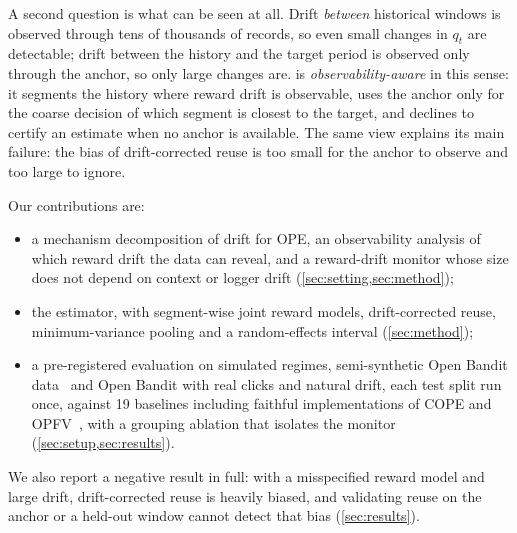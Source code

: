 A second question is what can be seen at all. Drift \emph{between} historical windows is
observed through tens of thousands of records, so even small changes in $q_t$ are detectable;
drift between the history and the target period is observed only through the anchor, so only
large changes are. \odrift{} is \emph{observability-aware} in this sense: it segments the
history where reward drift is observable, uses the anchor only for the coarse decision of which
segment is closest to the target, and declines to certify an estimate when no anchor is available.
The same view explains its main failure: the bias of drift-corrected reuse is too small for
the anchor to observe and too large to ignore.

Our contributions are:
\begin{itemize}
\item a mechanism decomposition of drift for OPE, an observability analysis of which reward
  drift the data can reveal, and a reward-drift monitor whose size does not depend on context
  or logger drift (\cref{sec:setting,sec:method});
\item the \odrift{} estimator, with segment-wise joint reward models, drift-corrected
  reuse, minimum-variance pooling and a random-effects interval (\cref{sec:method});
\item a pre-registered evaluation on simulated regimes, semi-synthetic Open Bandit
  data~\cite{saito2021open} and Open Bandit with real clicks and natural drift, each test split
  run once, against 19 baselines including faithful implementations of COPE and
  OPFV~\cite{shimizu2025offpolicy}, with a grouping ablation that isolates the monitor
  (\cref{sec:setup,sec:results}).
\end{itemize}
We also report a negative result in full: with a misspecified reward model and large drift,
drift-corrected reuse is heavily biased, and validating reuse on the anchor or a held-out window
cannot detect that bias (\cref{sec:results}).
